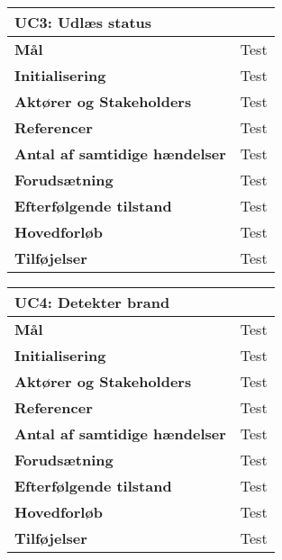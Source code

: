\begin{table}[htbp] \centering
\begin{tabular}{|l|l|} %
	\hline
\multicolumn{2}{|l|}{\textbf{UC3: Udlæs status}} \\\hline
\textbf{Mål}								&Test \\\hline
\textbf{Initialisering}					&Test \\\hline
\textbf{Aktører og Stakeholders}			&Test \\\hline
\textbf{Referencer}						&Test \\\hline
\textbf{Antal af samtidige hændelser}	&Test \\\hline
\textbf{Forudsætning}					&Test \\\hline
\textbf{Efterfølgende tilstand}			&Test \\\hline
\textbf{Hovedforløb}						&Test \\\hline
\textbf{Tilføjelser}						&Test \\\hline
	\end{tabular}
	\label{UC3} 
\end{table}

\begin{table}[htbp] \centering
\begin{tabular}{|l|l|} %
	\hline
\multicolumn{2}{|l|}{\textbf{UC4: Detekter brand}} \\\hline
\textbf{Mål}								&Test \\\hline
\textbf{Initialisering}					&Test \\\hline
\textbf{Aktører og Stakeholders}			&Test \\\hline
\textbf{Referencer}						&Test \\\hline
\textbf{Antal af samtidige hændelser}	&Test \\\hline
\textbf{Forudsætning}					&Test \\\hline
\textbf{Efterfølgende tilstand}			&Test \\\hline
\textbf{Hovedforløb}						&Test \\\hline
\textbf{Tilføjelser}						&Test \\\hline
	\end{tabular}
	\label{UC4} 
\end{table}

